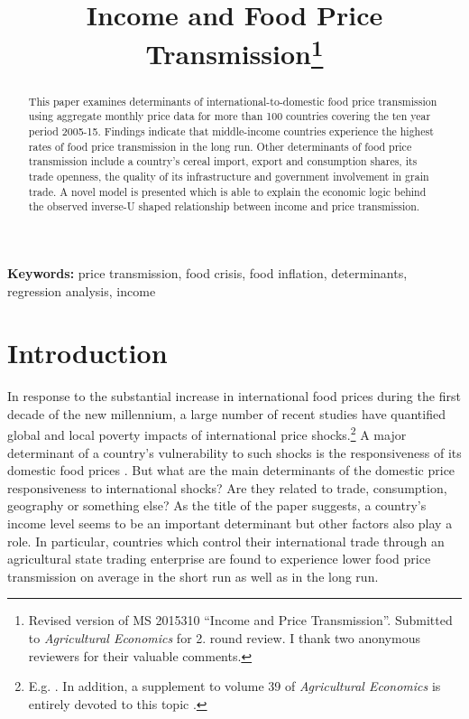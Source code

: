 \documentclass[12pt,english]{article}
\begin{document}


\title{Income and Food Price Transmission\footnote{Revised version of MS 2015310 ``Income and Price Transmission''. Submitted to \emph{Agricultural Economics} for 2. round review. I thank two anonymous reviewers for their valuable comments.}}

\date{\vspace{-5ex}}

\maketitle

\begin{abstract}
This paper examines determinants of international-to-domestic food price transmission using aggregate monthly price data for more than 100 countries covering the ten year period 2005-15. Findings indicate that middle-income countries experience the highest rates of food price transmission in the long run. Other determinants of food price transmission include a country's cereal import, export and consumption shares, its trade openness, the quality of its infrastructure and government involvement in grain trade. A novel model is presented which is able to explain the economic logic behind the observed inverse-U shaped relationship between income and price transmission.

\end{abstract}

\textbf{Keywords:} price transmission, food crisis, food inflation, determinants, regression analysis, income\newpage


\section{Introduction}
In response to the substantial increase in international food prices during the first decade of the new millennium, a large number of recent studies have quantified global and local poverty impacts of international price shocks.\footnote{E.g. \cite{Attanasio2013,Balagtas2014,Coxhead2012,Ferreira2013,Hoyos2011,Ivanic2012,Janvry2010,Mghenyi2011,Vu2011,Wodon2010}. In addition, a supplement to volume 39 of \emph{Agricultural Economics} is entirely devoted to this topic \citep[see][]{masters08}.} A major determinant of a country's vulnerability to such shocks is the responsiveness of its domestic food prices \citep[e.g.][]{Hoyos2011}. But what are the main determinants of the domestic price responsiveness to international shocks? Are they related to trade, consumption, geography or something else? As the title of the paper suggests, a country's income level seems to be an important determinant but other factors also play a role. In particular, countries which control their international trade through an agricultural state trading enterprise are found to experience lower food price transmission on average in the short run as well as in the long run.
\end{document}
